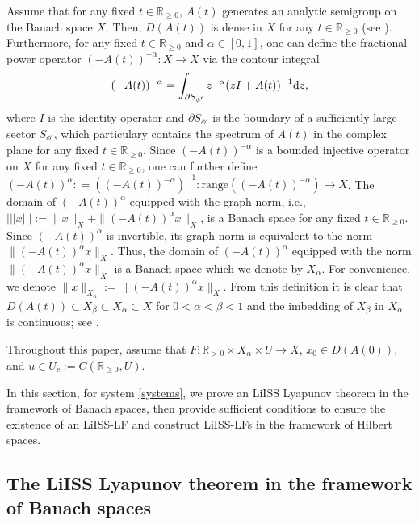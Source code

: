 \documentclass[onecolumn]{autart}
\newenvironment{proof of Prop.ODE}{{\it Proof of Proposition~\ref{Prop.ODE}:\enspace}}{\hfill $\blacksquare$\par}
\newenvironment{proof of PDE}{{\it Proof of Proposition \ref{Prop.8}:\enspace}}{\hfill $\blacksquare$\par}
\begin{document}
{Assume that for any fixed $t\in \mathbb{R}_{\geq 0}$, $A(t)$   generates
an analytic semigroup  on the Banach space $X$. Then,   $D(A(t))$ is dense in $X$ for any   $t\in \mathbb{R}_{\geq 0}$ (see \cite[Corollary~1.2.5]{Pazy2012semigroups}). Furthermore, for any fixed $t\in \mathbb{R}_{\geq 0}$ and $\alpha\in [0,1]$,  one can define the fractional power operator
$(-A(t))^{-\alpha} :  X  \rightarrow  X $   via the contour integral
\begin{align*}(-A(t))^{-\alpha} = \int_{\partial S_{\phi'}} z^{-\alpha}(zI + A(t))^{-1} {\rm d}z,
\end{align*}
where $I$ is the identity operator and $\partial S_{\phi'}$ is the boundary of a  sufficiently large sector   $S_{\phi'}$, which particulary contains the spectrum of $ A(t) $ in the complex plane for any fixed $t\in \mathbb{R}_{\geq 0}$.  Since $(-A(t))^{-\alpha}$ is a bounded injective operator on $X$ for any fixed $t\in \mathbb{R}_{\geq 0}$, one can further define $(-A(t))^{\alpha}: = ((-A(t))^{-\alpha})^{-1}: \text{range}((-A(t))^{-\alpha})\to  X$. The domain of $(-A(t))^{\alpha}$ equipped with the graph norm, i.e., $|||x|||:=\|x\|_{X}+\|(-A(t))^{\alpha}x\|_X$, is a Banach space for any fixed $t\in \mathbb{R}_{\geq0}$. Since $(-A(t))^{\alpha}$ is invertible, its graph norm is equivalent to the  norm $\| (-A(t))^{\alpha}x\|_X$. Thus,  the domain of $(-A(t))^{\alpha}$ equipped with the norm $\| (-A(t))^{\alpha}x\|_X$ is  a Banach space which we denote  by $X_{\alpha}$. For convenience, we denote $\|x\|_{X_{\alpha}}:=\| (-A(t))^{\alpha}x\|_X$.
From this definition it is clear that
$D(A(t))   \subset X _\beta  \subset X _\alpha \subset  X  $ for $0< \alpha<\beta < 1$ and  the imbedding of $X _\beta$ in $X _\alpha$ is
continuous;   see \cite[Sec. 2.6]{Pazy2012semigroups}.


{Throughout this paper, assume that {$F :\mathbb{R}_{>0}\times  X _{\alpha}\times  U\rightarrow  X $}, $x_0\in D(A(0)) $, and
	$u\in U_c:=C(\mathbb{R}_{\geq 0},{ U})$.}


In this section, for    system \eqref{systems},
we   prove an LiISS Lyapunov theorem in the framework of Banach spaces, then provide sufficient conditions to ensure the existence of an LiISS-LF and construct LiISS-LFs  in the framework of Hilbert spaces.

\subsection{The LiISS Lyapunov theorem   in the   framework of  Banach spaces}\label{sec:2}

}
\end{document}

